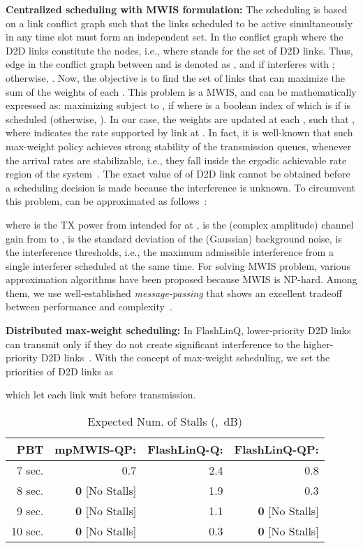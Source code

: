 \documentclass[journal]{IEEEtran}
\begin{document}
\textbf{Centralized scheduling with MWIS formulation:}
The scheduling is based on a link conflict graph such that the links scheduled to be active simultaneously in any time slot must form an independent set. In the conflict graph where the D2D links constitute the nodes, i.e.,  where  stands for the set of D2D links.
Thus, edge in the conflict graph between  and  is denoted as , and  if  interferes with ; otherwise, .
Now, the objective is to find the set of links that can maximize the sum of the weights  of each .
This problem is a MWIS, and can be mathematically expressed as: maximizing  subject to , if 
where  is a boolean index of  which is  if  is scheduled (otherwise, ). In our case, the weights are updated at each , such that , where  indicates the rate supported by link 
at . In fact, it is well-known that such max-weight policy achieves strong stability of the transmission queues, whenever the arrival rates are stabilizable, i.e., they fall inside the ergodic achievable rate region of the system~\cite{asilomar2012bethanabhotla}.
The exact value of  of D2D link  cannot be obtained before a scheduling decision is made because the interference is unknown.
To circumvent this problem,  can be approximated as follows~\cite{jsac2011win}:

where
     is the TX power from  intended for  at ,
     is the (complex amplitude) channel gain from  to ,
     is the standard deviation of the (Gaussian) background noise,
     is the interference thresholds, i.e., the maximum admissible interference  from a single interferer scheduled at the same time.
For solving MWIS problem, various approximation algorithms have been proposed because MWIS is NP-hard. Among them, we use well-established \textit{message-passing} that shows an excellent tradeoff between performance and complexity~\cite{tit2009sanghavi}.

\textbf{Distributed max-weight scheduling:}
In FlashLinQ, lower-priority D2D links can transmit only if they do not create significant interference to the higher-priority D2D links~\cite{ton2013wu}.
With the concept of max-weight scheduling, we set the priorities of D2D links as

which let each link wait  before transmission.


\begin{table}[t!]{\footnotesize
\caption{Expected Num. of Stalls (, \,dB)}
\label{tbl-prebuffering2}
    \centering \begin{tabular}{r||r|r|r}
    \hline\hline
    PBT
    & mpMWIS-QP:
    & FlashLinQ-Q:
    & FlashLinQ-QP: \\
	\hline
     7 sec. &   0.7 &  2.4 &  0.8 \\
     8 sec. &   \textbf{0} [No Stalls] &  1.9 &  0.3 \\
     9 sec. &   \textbf{0} [No Stalls] &  1.1 &  \textbf{0} [No Stalls] \\
    10 sec. &   \textbf{0} [No Stalls] &  0.3 &  \textbf{0} [No Stalls] \\
	\hline\hline
	\end{tabular}
}
\end{table}
\end{document}
